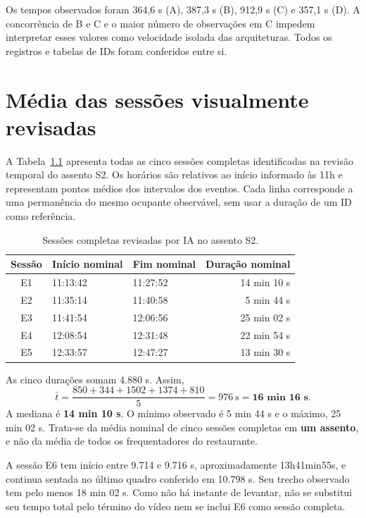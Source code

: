 \documentclass[12pt,a4paper,twoside,openany,chapter=TITLE,subsection=TITLE,section=TITLE,subsubsection=TITLE,english,brazil]{abntex2}
\newcommand{\fontedados}[1]{\par\vspace{3pt}{\footnotesize Fonte: #1.}\par}
\begin{document}
Os tempos observados foram 364,6 s (A), 387,3 s (B), 912,9 s (C) e 357,1 s (D). A concorrência de B e C e o maior número de observações em C impedem interpretar esses valores como velocidade isolada das arquiteturas. Todos os registros e tabelas de IDs foram conferidos entre si.

\clearpage
\chapter{Média das sessões visualmente revisadas}
A Tabela~\ref{tab:media} apresenta todas as cinco sessões completas identificadas na revisão temporal do assento S2. Os horários são relativos ao início informado às 11h e representam pontos médios dos intervalos dos eventos. Cada linha corresponde a uma permanência do mesmo ocupante observável, sem usar a duração de um ID como referência.

\begin{table}[H]
\centering
\caption{Sessões completas revisadas por IA no assento S2.}
\label{tab:media}
\begin{tabular}{cllr}
\toprule
Sessão & Início nominal & Fim nominal & Duração nominal\\
\midrule
E1 & 11:13:42 & 11:27:52 & 14 min 10 s \\
E2 & 11:35:14 & 11:40:58 & 5 min 44 s \\
E3 & 11:41:54 & 12:06:56 & 25 min 02 s \\
E4 & 12:08:54 & 12:31:48 & 22 min 54 s \\
E5 & 12:33:57 & 12:47:27 & 13 min 30 s \\
\bottomrule
\end{tabular}
\fontedados{revisão visual por IA e cálculo reproduzível, sem validação humana independente}
\end{table}
As cinco durações somam 4.880 s. Assim,
\begin{equation}
\bar t=\frac{850+344+1502+1374+810}{5}=976\ \mathrm{s}
=\textbf{16 min 16 s}.
\end{equation}
A mediana é \textbf{14 min 10 s}. O mínimo observado é 5 min 44 s e o máximo, 25 min 02 s. Trata-se da média nominal de cinco sessões completas em \textbf{um assento}, e não da média de todos os frequentadores do restaurante.

A sessão E6 tem início entre 9.714 e 9.716 s, aproximadamente 13h41min55s, e continua sentada no último quadro conferido em 10.798 s. Seu trecho observado tem pelo menos 18 min 02 s. Como não há instante de levantar, não se substitui seu tempo total pelo término do vídeo nem se inclui E6 como sessão completa.
\end{document}
